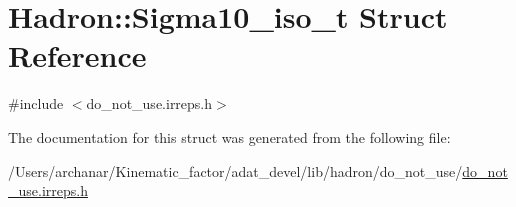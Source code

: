 \hypertarget{structHadron_1_1Sigma10__iso__t}{}\section{Hadron\+:\+:Sigma10\+\_\+iso\+\_\+t Struct Reference}
\label{structHadron_1_1Sigma10__iso__t}


{\ttfamily \#include $<$do\+\_\+not\+\_\+use.\+irreps.\+h$>$}



The documentation for this struct was generated from the following file\+:\begin{DoxyCompactItemize}
\item 
/\+Users/archanar/\+Kinematic\+\_\+factor/adat\+\_\+devel/lib/hadron/do\+\_\+not\+\_\+use/\mbox{\hyperlink{do__not__use_8irreps_8h}{do\+\_\+not\+\_\+use.\+irreps.\+h}}\end{DoxyCompactItemize}
